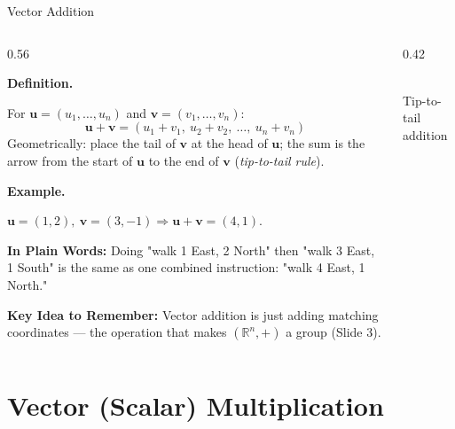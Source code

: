 \documentclass[9pt,aspectratio=169]{beamer}
\newcommand{\keyidea}[1]{%
\par\medskip\noindent\textbf{Key Idea to Remember:} #1\par\medskip}
\newcommand{\childex}[1]{%
\par\medskip\noindent\textbf{In Plain Words:} #1\par\medskip}
\begin{document}
\begin{frame}{Vector Addition}
\footnotesize
\begin{columns}[T]
\begin{column}{0.56\textwidth}
\par\noindent\textbf{Definition.}\par
For $\mathbf{u}=(u_1,\dots,u_n)$ and $\mathbf{v}=(v_1,\dots,v_n)$:
\[ \mathbf{u} + \mathbf{v} = (u_1+v_1,\ u_2+v_2,\ \dots,\ u_n+v_n) \]
Geometrically: place the tail of $\mathbf{v}$ at the head of $\mathbf{u}$; the sum is the
arrow from the start of $\mathbf{u}$ to the end of $\mathbf{v}$ (\emph{tip-to-tail rule}).
\medskip

\par\noindent\textbf{Example.}\par
$\mathbf{u}=(1,2),\ \mathbf{v}=(3,-1) \Rightarrow \mathbf{u}+\mathbf{v}=(4,1)$.
\medskip

\childex{Doing "walk 1 East, 2 North" then "walk 3 East, 1 South" is the same as one
combined instruction: "walk 4 East, 1 North."}

\keyidea{Vector addition is just adding matching coordinates --- the operation that makes
$(\mathbb{R}^n, +)$ a group (Slide 3).}
\end{column}
\begin{column}{0.42\textwidth}
\centering
{}
\\[0.3em]{\scriptsize Tip-to-tail addition}
\end{column}
\end{columns}
\end{frame}

\section{Vector (Scalar) Multiplication}
\end{document}

